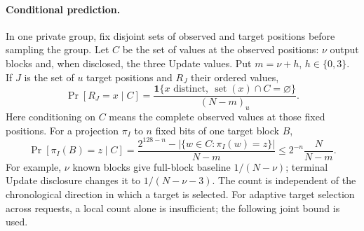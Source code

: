 \documentclass[journal=tosc,preprint,floatrow,nohyperxmp]{iacrtrans}
\newif\ifjordireview
\newcounter{jordinote}
\newcommand{\jordinote}[2]{%
  \ifjordireview
  \stepcounter{jordinote}\par\medskip\noindent
  \fcolorbox{blue!55!black}{blue!4}{%
    \begin{minipage}{\dimexpr\linewidth-2\fboxsep-2\fboxrule\relax}
    \small\raggedright\color{blue!45!black}
    \textbf{Solo Jordi -- J\thejordinote: #1}\par\smallskip
    #2
    \end{minipage}}\par\medskip
  \fi
}
\numberwithin{lemma}{section}
\numberwithin{proposition}{section}
\newcommand{\fall}[2]{(#1)_{#2}}
\numberwithin{equation}{section}
\theoremstyle{definition}
\numberwithin{definition}{section}
\theoremstyle{plain}
\begin{document}
\paragraph{Conditional prediction.}
In one private group, fix disjoint sets of observed and target positions before sampling the group. Let $C$ be the set of values at the observed positions: $\nu$ output blocks and, when disclosed, the three Update values. Put $m=\nu+h$, $h\in\{0,3\}$. If $J$ is the set of $u$ target positions and $R_J$ their ordered values,
\begin{equation}
 \Pr[R_J=x\mid C]
 =\frac{\mathbf1\{x\text{ distinct},\ \operatorname{set}(x)\cap C=\varnothing\}}
 {\fall{N-m}u}.
 \label{eq:fixed-local-law}
\end{equation}
Here conditioning on $C$ means the complete observed values at those fixed positions. For a projection $\pi_I$ to $n$ fixed bits of one target block $B$,
\begin{equation}
 \Pr[\pi_I(B)=z\mid C]
 =\frac{2^{128-n}-|\{w\in C:\pi_I(w)=z\}|}{N-m}
 \le 2^{-n}\frac{N}{N-m}.
 \label{eq:fixed-local-bits}
\end{equation}
For example, $\nu$ known blocks give full-block baseline $1/(N-\nu)$; terminal Update disclosure changes it to $1/(N-\nu-3)$. The count is independent of the chronological direction in which a target is selected. For adaptive target selection across requests, a local count alone is insufficient; the following joint bound is used.

\jordinote{Conteo local frente a selección adaptativa}{El conteo anterior exige posiciones fijadas antes de muestrear. No debe usarse directamente cuando el observador selecciona objetivos después de ver partes de varios bloques: esa selección puede sesgar lo que queda oculto. Por eso la proposición siguiente domina la distribución conjunta de todo el intervalo. Revisa esta diferencia; ya motivó una corrección importante del argumento.}
\end{document}
